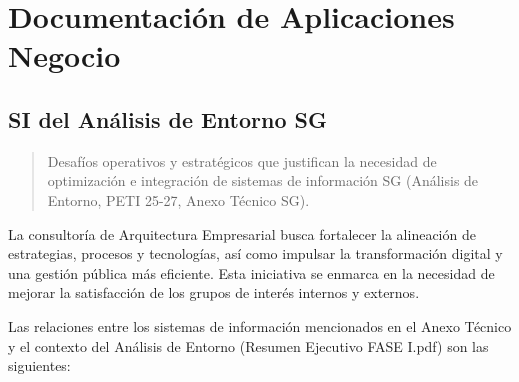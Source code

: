 \documentclass[
	a4paper, %
	12pt, %
]{include/CSSullivanBusinessReport}
\begin{document}
\newpage

\begin{twothirdswidth} %
	\tableofcontents %
\end{twothirdswidth}

\newpage


\newpage

\section{Documentación de Aplicaciones
Negocio}\label{sec:documentaciuxf3n-de-aplicaciones-negocio}

\subsection{SI del Análisis de Entorno
SG}\label{sec:si-del-anuxe1lisis-de-entorno-sg}

\begin{quote}
Desafíos operativos y estratégicos que justifican la necesidad de
optimización e integración de sistemas de información SG (Análisis de
Entorno, PETI 25-27, Anexo Técnico SG).
\end{quote}

La consultoría de Arquitectura Empresarial busca fortalecer la
alineación de estrategias, procesos y tecnologías, así como impulsar la
transformación digital y una gestión pública más eficiente. Esta
iniciativa se enmarca en la necesidad de mejorar la satisfacción de los
grupos de interés internos y externos.

Las relaciones entre los sistemas de información mencionados en el Anexo
Técnico y el contexto del Análisis de Entorno (Resumen Ejecutivo FASE
I.pdf) son las siguientes:
\end{document}
